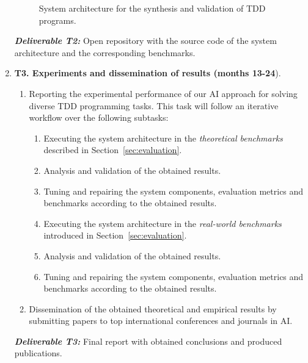 \documentclass[10pt,a4paper]{paper}
\begin{document}
\begin{enumerate}
\begin{figure}[hbt!]
\begin{center}
\end{center}  
\caption{\small System architecture for the synthesis and validation of TDD programs.}
\label{fig:architecture}
\end{figure}

{\small{\bf\em Deliverable T2:} Open repository with the source code of the system architecture and the corresponding benchmarks.}
    
\item {\bf T3. Experiments and dissemination of results (months 13-24}).
   \begin{small}
      \begin{enumerate}
      \item Reporting the experimental performance of our AI approach for solving diverse TDD programming tasks. This task will follow an iterative workflow over the following subtasks:
      \begin{enumerate}
      \item Executing the system architecture in the {\em theoretical benchmarks} described in Section~\ref{sec:evaluation}.
      \item Analysis and validation of the obtained results.
      \item Tuning and repairing the system components, evaluation metrics and benchmarks according to the obtained results.                 
      \item Executing the system architecture in the {\em real-world benchmarks} introduced in Section~\ref{sec:evaluation}.
      \item Analysis and validation of the obtained results.         
      \item Tuning and repairing the system components, evaluation metrics and benchmarks according to the obtained results.                 
      \end{enumerate}
      \item Dissemination of the obtained theoretical and empirical results by submitting papers to top international conferences and journals in AI.        
      \end{enumerate}
\end{small}        
{\small{\bf\em  Deliverable T3:} Final report with obtained conclusions and produced publications.}
\end{enumerate}
\end{document}
